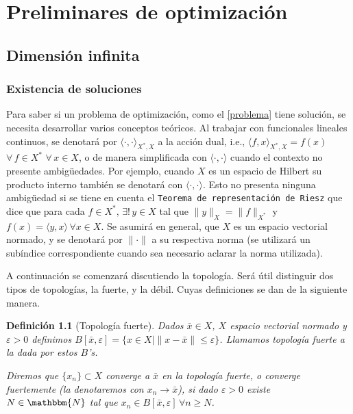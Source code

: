 \documentclass[a4paper,10pt]{book}
\newcommand{\N}{\mathbbm{N}}
\newcommand{\bx}{\bar{x}}
\newcommand{\la}{\langle}
\newcommand{\ra}{\rangle}
\newtheorem{defi}[teo]{Definici\'on}
\newcounter{ejem}[section]
\begin{document}


\chapter{Preliminares de optimización}
\section{Dimensión infinita}
\subsection{Existencia de soluciones}\label{existenciadesoluciones}

Para saber si un problema de optimización, como el \eqref{problema} tiene solución, se necesita desarrollar varios conceptos teóricos. Al trabajar con funcionales lineales continuos, se denotará por $\la\cdot,\cdot\ra_{X^*,X}$ a la acción dual, i.e., $\la f,x\ra_{X^*,X}=f(x)$ $\forall\,f\in X^*$ $\forall\, x\in X$, o de manera simplificada con $\la\cdot,\cdot\ra$ cuando el contexto no presente ambigüedades. Por ejemplo, cuando $X$ es un espacio de Hilbert su producto interno también se denotará con $\la\cdot,\cdot\ra$. Esto no presenta ninguna ambigüedad si se tiene en cuenta el \texttt{Teorema de representación de Riesz} que dice que para cada $f\in X^*,\,\exists!\, y\in X$ tal que $\|y\|_X=\|f\|_{X^*}$ y $f(x)=\la y,x\ra\,\forall x\in X$. Se asumirá en general, que $X$ es un espacio vectorial normado, y se denotará por $\|\cdot\|$ a su respectiva norma (se utilizará un subíndice correspondiente cuando sea necesario aclarar la norma utilizada).


A continuación se comenzará discutiendo la topología. Será útil distinguir dos tipos de topologías, la fuerte, y la débil. Cuyas definiciones se dan de la siguiente manera.

\begin{defi}[Topología fuerte]
Dados $\bx\in X$, $X$ espacio vectorial normado y $\varepsilon>0$ definimos $B[\bx,\varepsilon]=\{x\in X \mid \|x-\bx\|\leq\varepsilon\}$. Llamamos topología fuerte a la dada por estos $B$'s.

Diremos que $\{x_n\}\subset X$ converge a $\bx$ en la topología fuerte, o converge fuertemente (la denotaremos con $x_n\to \bx$), si dado $\varepsilon>0$ existe $N\in \N$ tal que $x_n\in B[\bx,\varepsilon]\,\forall n\geq N$.
\end{defi}
\end{document}
